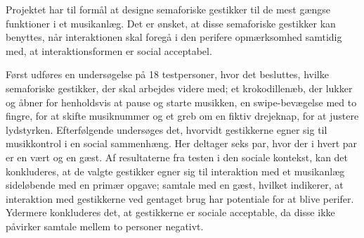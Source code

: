Projektet har til formål at designe semaforiske gestikker til de mest gængse funktioner i et musikanlæg. Det er ønsket, at disse semaforiske gestikker kan benyttes, når interaktionen skal foregå i den perifere opmærksomhed samtidig med, at interaktionsformen er social acceptabel. 

Først udføres en undersøgelse på 18 testpersoner, hvor det besluttes, hvilke semaforiske gestikker, der skal arbejdes videre med; et krokodillenæb, der lukker og åbner for henholdsvis at pause og starte musikken, en swipe-bevægelse med to fingre, for at skifte musiknummer og et greb om en fiktiv drejeknap, for at justere lydstyrken. Efterfølgende undersøges det, hvorvidt gestikkerne egner sig til musikkontrol i en social sammenhæng. Her deltager seks par, hvor der i hvert par er en vært og en gæst. Af resultaterne fra testen i den sociale kontekst, kan det konkluderes, at de valgte gestikker egner sig til interaktion med et musikanlæg sideløbende med en primær opgave; samtale med en gæst, hvilket indikerer, at interaktion med gestikkerne ved gentaget brug har potentiale for at blive perifer. Ydermere konkluderes det, at gestikkerne er sociale acceptable, da disse ikke påvirker samtale mellem to personer negativt. 